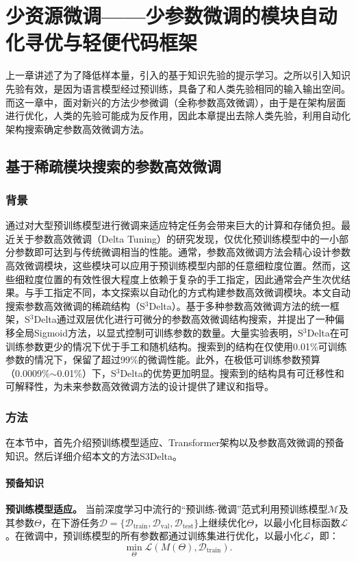 \chapter{少资源微调——少参数微调的模块自动化寻优与轻便代码框架}

上一章讲述了为了降低样本量，引入的基于知识先验的提示学习。之所以引入知识先验有效，是因为语言模型经过预训练，具备了和人类先验相同的输入输出空间。而这一章中，面对新兴的方法少参微调（全称参数高效微调），由于是在架构层面进行优化，人类的先验可能成为反作用，因此本章提出去除人类先验，利用自动化架构搜索确定参数高效微调方法。

\section{基于稀疏模块搜索的参数高效微调}
\subsection{背景}

通过对大型预训练模型进行微调来适应特定任务会带来巨大的计算和存储负担。最近关于参数高效微调（Delta Tuning）的研究发现，仅优化预训练模型中的一小部分参数即可达到与传统微调相当的性能。通常，参数高效微调方法会精心设计参数高效微调模块，这些模块可以应用于预训练模型内部的任意细粒度位置。然而，这些细粒度位置的有效性很大程度上依赖于复杂的手工指定，因此通常会产生次优结果。与手工指定不同，本文探索以自动化的方式构建参数高效微调模块。本文自动搜索参数高效微调的稀疏结构（S$^3$Delta）。基于多种参数高效微调方法的统一框架，S$^3$Delta通过双层优化进行可微分的参数高效微调结构搜索，并提出了一种偏移全局Sigmoid方法，以显式控制可训练参数的数量。大量实验表明，S$^3$Delta在可训练参数更少的情况下优于手工和随机结构。搜索到的结构在仅使用0.01\%可训练参数的情况下，保留了超过99\%的微调性能。此外，在极低可训练参数预算（0.0009\%$\sim$0.01\%）下，S$^3$Delta的优势更加明显。搜索到的结构具有可迁移性和可解释性，为未来参数高效微调方法的设计提供了建议和指导。


\subsection{方法}
在本节中，首先介绍预训练模型适应、Transformer架构以及参数高效微调的预备知识。然后详细介绍本文的方法S3Delta。

\subsubsection{预备知识}
\label{sec:meth:preliminaries}
\textbf{预训练模型适应。} 当前深度学习中流行的“预训练-微调”范式利用预训练模型$\mathcal{M}$及其参数$\Theta$，在下游任务$\mathcal{D}=\{\mathcal{D}_{\text{train}}, \mathcal{D}_{\text{val}}, \mathcal{D}_{\text{test}}\}$上继续优化$\Theta$，以最小化目标函数$\mathcal{L}$。在微调中，预训练模型的所有参数都通过训练集进行优化，以最小化$\mathcal{L}$，即：
\begin{equation}
   \operatorname{min}_\Theta \mathcal{L}(M(\Theta), \mathcal{D}_{\text{train}}).
\end{equation}

